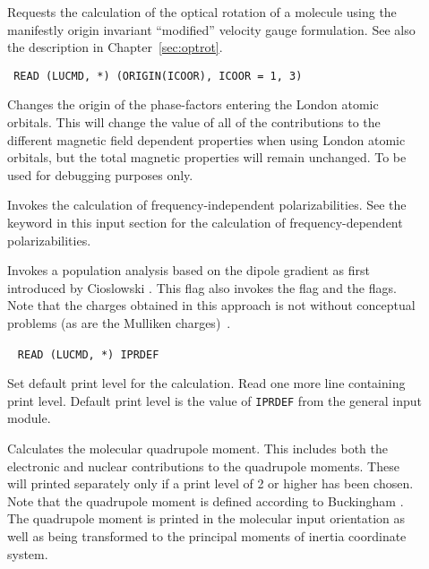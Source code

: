 \begin{description}
\item[] Requests the calculation of the optical rotation
of a molecule using the manifestly origin invariant ``modified''
velocity gauge formulation\cite{Pedersen:ORMVE}.
See also the description in Chapter~\ref{sec:optrot}.

\item[]\verb| |\newline
\verb|READ (LUCMD, *) (ORIGIN(ICOOR), ICOOR = 1, 3)|

Changes the origin of the phase-factors entering the London atomic orbitals.
This will change the value of all of the contributions to
the different magnetic field dependent properties when using London
atomic orbitals, but the total magnetic properties will remain
unchanged. To be used for debugging purposes only.

\item[] Invokes the calculation of frequency-independent
polarizabilities. See the keyword  in
this input section for the calculation of frequency-dependent polarizabilities.

\item[] Invokes a population analysis based on the
dipole gradient as first introduced by Cioslowski \cite{jcjacs111}.
This flag also invokes the  flag and the  flags.
Note that the charges obtained in this approach is not without conceptual problems (as are the Mulliken charges)~\cite{hskrpoajcp120}.

\item[]\verb| |
\newline
\verb|READ (LUCMD, *) IPRDEF|

Set default print level for the calculation.  Read one
more line containing print level. Default print level is the
value of \verb|IPRDEF| from the general input module.

\item[] Calculates the molecular quadrupole
moment.
This includes both the electronic and nuclear contributions to the
quadrupole moments. These will printed separately only if a print
level of 2 or higher has been chosen. Note that the quadrupole moment is
defined according to Buckingham \cite{adbacp12}. The quadrupole moment
is printed in the molecular input orientation as well as being
transformed to the principal moments of inertia coordinate system.


\end{description}
